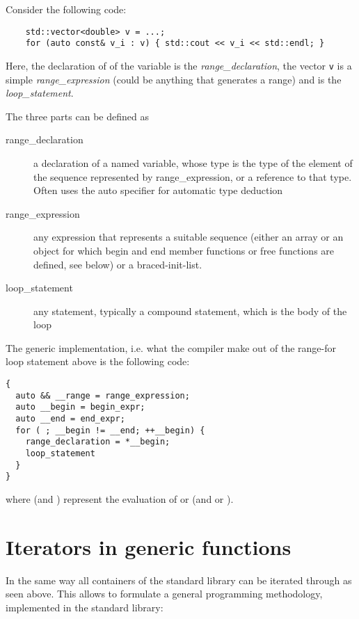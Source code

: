 \begin{example}
  Consider the following code:
  \begin{verbatim}
    std::vector<double> v = ...;
    for (auto const& v_i : v) { std::cout << v_i << std::endl; }
  \end{verbatim}

  Here, the declaration of of the variable  is the \emph{range\_declaration}, the vector \texttt{v} is a simple
  \emph{range\_expression} (could be anything that generates a range) and  is the \emph{loop\_statement}.
\end{example}

The three parts can be defined as
\begin{description}
  \item[range\_declaration]
    a declaration of a named variable, whose type is the type of the element of the sequence represented by range\_expression, or a reference
    to that type. Often uses the auto specifier for automatic type deduction
  \item[range\_expression]
    any expression that represents a suitable sequence (either an array or an object for which begin and end member functions or free functions
    are defined, see below) or a braced-init-list.
  \item[loop\_statement]
    any statement, typically a compound statement, which is the body of the loop
\end{description}

The generic implementation, i.e. what the compiler make out of the range-for loop statement above is the following code:
%
\begin{verbatim}
{
  auto && __range = range_expression;
  auto __begin = begin_expr;
  auto __end = end_expr;
  for ( ; __begin != __end; ++__begin) {
    range_declaration = *__begin;
    loop_statement
  }
}
\end{verbatim}
where  (and ) represent the evaluation of  or  (and  or ).


\section{Iterators in generic functions}
In the same way all containers of the standard library can be iterated through as seen above.
This allows to formulate a general programming methodology, implemented in the standard library:

